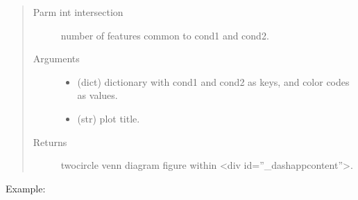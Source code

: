 \documentclass[letterpaper,10pt,english]{sphinxmanual}
\begin{document}
\begin{fulllineitems}
\begin{quote}
\begin{description}
\begin{itemize}
\end{itemize}

\item[{Parm int intersection}] \leavevmode
number of features common to cond1 and cond2.

\item[{Arguments}] \leavevmode\begin{itemize}
\item {} 
 (dict) \textendash{} dictionary with cond1 and cond2 as keys, and color codes as values.

\item {} 
 (str) \textendash{} plot title.

\end{itemize}

\item[{Returns}] \leavevmode
two\sphinxhyphen{}circle venn diagram figure within \textless{}div id=”\_dash\sphinxhyphen{}app\sphinxhyphen{}content”\textgreater{}.

\end{description}\end{quote}

Example:

\begin{sphinxVerbatim}[commandchars=\\\{\}]
                                              
\end{sphinxVerbatim}

\end{fulllineitems}
\end{document}
